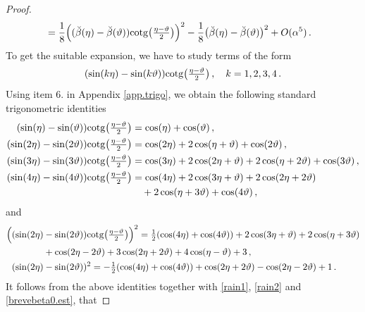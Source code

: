 \documentclass[a4paper,reqno,10pt]{article}
\begin{document}
\begin{proof}
\begin{align}
		& = \frac18 \Big(  (\breve{\beta}(\eta)-\breve{\beta}(\vartheta)) {\rm cotg} \big( \tfrac{\eta-\vartheta}{2} \big)  \Big)^2 - \frac18 \big( \breve{\beta}(\eta)-\breve{\beta}(\vartheta) \big)^2 + O(\alpha^5) \,.\label{rain2}
	\end{align}	
To get the suitable expansion, we have to study terms of the form
\begin{equation}
	(\sin(k\eta)-\sin(k\vartheta)) {\rm cotg} \big( \tfrac{\eta-\vartheta}{2} \big) \,, \quad k =1,2,3,4 \,.
\end{equation}
Using item $6.$ in Appendix \ref{app.trigo}, we obtain the following standard trigonometric identities
\begin{equation*}%
	\begin{aligned}
		(\sin(\eta)-\sin(\vartheta)) {\rm cotg} \big( \tfrac{\eta-\vartheta}{2} \big) & =   \cos(\eta)+ \cos(\vartheta) \,, \\
		(\sin(2\eta)-\sin(2\vartheta)) {\rm cotg} \big( \tfrac{\eta-\vartheta}{2} \big) & = \cos(2\eta) + 2\cos(\eta+\vartheta) + \cos(2\vartheta) \,, \\
		(\sin(3\eta)-\sin(3\vartheta)) {\rm cotg} \big( \tfrac{\eta-\vartheta}{2} \big) & = \cos(3\eta) + 2 \cos(2\eta+\vartheta) + 2 \cos(\eta+2\vartheta)  + \cos(3\vartheta) \,,  \\
		(\sin(4\eta)-\sin(4\vartheta)) {\rm cotg} \big( \tfrac{\eta-\vartheta}{2} \big) & = \cos(4\eta) + 2 \cos(3\eta+\vartheta) + 2 \cos(2\eta+2\vartheta) \\
		& \quad + 2 \cos(\eta+3\vartheta) + \cos(4\vartheta) \,, 
	\end{aligned}
\end{equation*}
and 
\begin{equation*}%
	\begin{aligned}
		\Big(	(\sin(2\eta)&-\sin(2\vartheta)) {\rm cotg} \big( \tfrac{\eta-\vartheta}{2} \big)  \Big)^2 =  \tfrac12(\cos(4\eta)+\cos(4\vartheta)) +2  \cos(3\eta+\vartheta)
			+2\cos(\eta+3\vartheta)  \\
		&+ \cos(2\eta-2\vartheta) + 3\cos(2\eta+2\vartheta) + 4 \cos(\eta-\vartheta) + 3 \,, \\
		(\sin(2\eta)&-\sin(2\vartheta))^2 = -\tfrac12 (\cos(4\eta)+\cos(4\vartheta)) + \cos(2\eta+2\vartheta) - \cos(2\eta-2\vartheta) +1 \,.
	\end{aligned}
\end{equation*}
It follows from the above identities together with \eqref{rain1}, \eqref{rain2} and \eqref{brevebeta0.est}, that

\end{proof}
\end{document}
